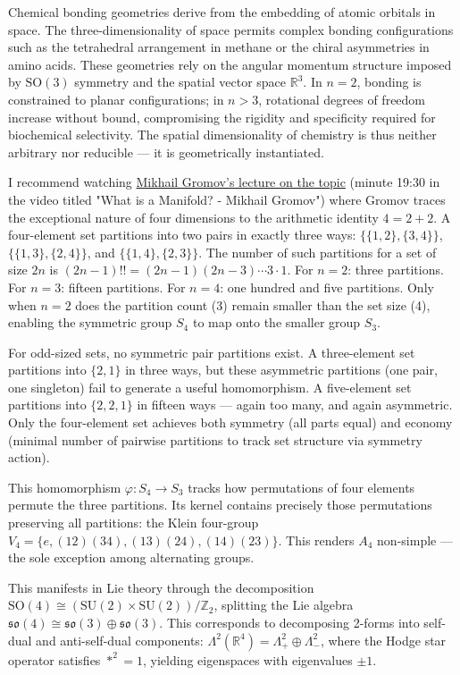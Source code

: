 Chemical bonding geometries derive from the embedding of atomic orbitals in space. The three-dimensionality of space permits complex bonding configurations such as the tetrahedral arrangement in methane or the chiral asymmetries in amino acids. These geometries rely on the angular momentum structure imposed by $\mathrm{SO}(3)$ symmetry and the spatial vector space $\mathbb{R}^3$. In $n=2$, bonding is constrained to planar configurations; in $n>3$, rotational degrees of freedom increase without bound, compromising the rigidity and specificity required for biochemical selectivity. The spatial dimensionality of chemistry is thus neither arbitrary nor reducible — it is geometrically instantiated.

I recommend watching \href{http://youtu.be/u5DLpAqX4YA&t=1170s}{Mikhail Gromov's lecture on the topic} (minute 19:30 in the video titled "What is a Manifold? - Mikhail Gromov") where Gromov traces the exceptional nature of four dimensions to the arithmetic identity $4 = 2 + 2$. A four-element set partitions into two pairs in exactly three ways: $\{\{1,2\}, \{3,4\}\}$, $\{\{1,3\}, \{2,4\}\}$, and $\{\{1,4\}, \{2,3\}\}$. The number of such partitions for a set of size $2n$ is $(2n-1)!! = (2n-1)(2n-3)\cdots 3 \cdot 1$. For $n=2$: three partitions. For $n=3$: fifteen partitions. For $n=4$: one hundred and five partitions. Only when $n=2$ does the partition count (3) remain smaller than the set size (4), enabling the symmetric group $S_4$ to map onto the smaller group $S_3$.

For odd-sized sets, no symmetric pair partitions exist. A three-element set partitions into $\{2,1\}$ in three ways, but these asymmetric partitions (one pair, one singleton) fail to generate a useful homomorphism. A five-element set partitions into $\{2,2,1\}$ in fifteen ways — again too many, and again asymmetric. Only the four-element set achieves both symmetry (all parts equal) and economy (minimal number of pairwise partitions to track set structure via symmetry action).

This homomorphism $\varphi: S_4 \to S_3$ tracks how permutations of four elements permute the three partitions. Its kernel contains precisely those permutations preserving all partitions: the Klein four-group $V_4 = \{e, (12)(34), (13)(24), (14)(23)\}$. This renders $A_4$ non-simple — the sole exception among alternating groups.

This manifests in Lie theory through the decomposition $\mathrm{SO}(4) \cong (\mathrm{SU}(2) \times \mathrm{SU}(2))/\mathbb{Z}_2$, splitting the Lie algebra $\mathfrak{so}(4) \cong \mathfrak{so}(3) \oplus \mathfrak{so}(3)$. This corresponds to decomposing 2-forms into self-dual and anti-self-dual components: $\Lambda^2(\mathbb{R}^4) = \Lambda^2_+ \oplus\Lambda^2_-$, where the Hodge star operator satisfies $*^2 = 1$, yielding eigenspaces with eigenvalues $\pm 1$.

